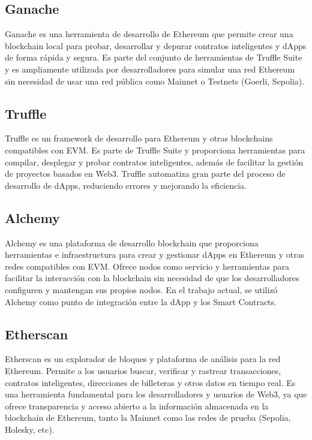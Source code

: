 \subsection{Ganache}

Ganache \cite{ganache_website} es una herramienta de desarrollo de Ethereum que permite crear una blockchain local para probar, desarrollar y depurar contratos inteligentes y dApps de forma rápida y segura. Es parte del conjunto de herramientas de Truffle Suite y es ampliamente utilizada por desarrolladores para simular una red Ethereum sin necesidad de usar una red pública como Mainnet o Testnets (Goerli, Sepolia).


\subsection{Truffle}

Truffle \cite{truffle_website} es un framework de desarrollo para Ethereum y otras blockchains compatibles con EVM. Es parte de Truffle Suite y proporciona herramientas para compilar, desplegar y probar contratos inteligentes, además de facilitar la gestión de proyectos basados en Web3. Truffle automatiza gran parte del proceso de desarrollo de dApps, reduciendo errores y mejorando la eficiencia.

\subsection{Alchemy}

Alchemy \cite{alchemy_website} es una plataforma de desarrollo blockchain que proporciona herramientas e infraestructura para crear y gestionar dApps en Ethereum y otras redes compatibles con EVM. Ofrece nodos como servicio y herramientas para facilitar la interacción con la blockchain sin necesidad de que los desarrolladores configuren y mantengan sus propios nodos. En el trabajo actual, se utilizó Alchemy como punto de integración entre la dApp y los Smart Contracts.

\subsection{Etherscan}

Etherscan \cite{etherscan} es un explorador de bloques y plataforma de análisis para la red Ethereum. Permite a los usuarios buscar, verificar y rastrear transacciones, contratos inteligentes, direcciones de billeteras y otros datos en tiempo real. Es una herramienta fundamental para los desarrolladores y usuarios de Web3, ya que ofrece transparencia y acceso abierto a la información almacenada en la blockchain de Ethereum, tanto la Mainnet como las redes de prueba (Sepolia, Holesky, etc).

